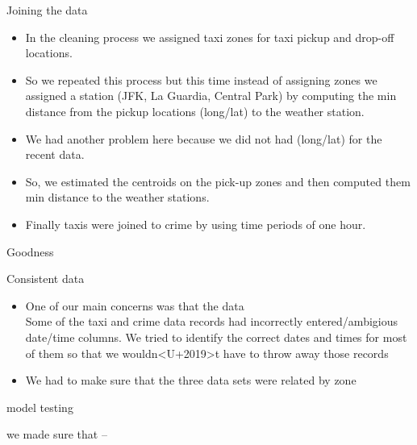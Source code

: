 \documentclass[10pt,ignorenonframetext,]{beamer}
\providecommand{\tightlist}{%
  \setlength{\itemsep}{0pt}\setlength{\parskip}{0pt}}
\begin{document}
\begin{frame}

\begin{block}{Joining the data}

\begin{itemize}[<+->]
\tightlist
\item
  In the cleaning process we assigned taxi zones for taxi pickup and
  drop-off locations.
\end{itemize}

\begin{itemize}[<+->]
\tightlist
\item
  So we repeated this process but this time instead of assigning zones
  we assigned a station (JFK, La Guardia, Central Park) by computing the
  min distance from the pickup locations (long/lat) to the weather
  station.
\item
  We had another problem here because we did not had (long/lat) for the
  recent data.
\item
  So, we estimated the centroids on the pick-up zones and then computed
  them min distance to the weather stations.
\end{itemize}

\begin{itemize}[<+->]
\tightlist
\item
  Finally taxis were joined to crime by using time periods of one hour.
\end{itemize}

\end{block}

\end{frame}

\begin{frame}{%
\protect\hypertarget{goodness}{%
Goodness}}

\begin{block}{Consistent data}

\begin{itemize}
\tightlist
\item
  One of our main concerns was that the data\\
  Some of the taxi and crime data records had incorrectly
  entered/ambigious date/time columns. We tried to identify the correct
  dates and times for most of them so that we
  wouldn\textless{}U+2019\textgreater{}t have to throw away those
  records
\item
  We had to make sure that the three data sets were related by zone
\end{itemize}

\end{block}

\begin{block}{model testing}

we made sure that –

\end{block}

\end{frame}
\end{document}
